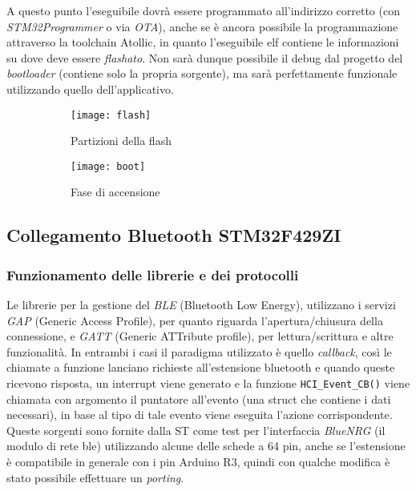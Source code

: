 A questo punto l'eseguibile dovr\`a essere programmato all'indirizzo corretto (con \textit{STM32Programmer} o via \textit{OTA}), anche se \`e ancora possibile la programmazione attraverso la toolchain Atollic, in quanto l'eseguibile elf contiene le informazioni su dove deve essere \textit{flashato}. Non sar\`a dunque possibile il debug dal progetto del \textit{bootloader} (contiene solo la propria sorgente), ma sar\`a perfettamente funzionale utilizzando quello dell'applicativo.

\begin{figure}[ht]
  \center
  \begin{subfigure}{.45\textwidth}
    \texttt{[image: flash]}
    \caption{Partizioni della flash}
  \end{subfigure}
  \hfill
  \begin{subfigure}{.45\textwidth}
    \texttt{[image: boot]}
    \caption{Fase di accensione}
  \end{subfigure}
  \caption{}
\end{figure}


\subsection{Collegamento Bluetooth STM32F429ZI}

\subsubsection{Funzionamento delle librerie e dei protocolli}

Le librerie per la gestione del \textit{BLE} (Bluetooth Low Energy), utilizzano i servizi \textit{GAP} (Generic Access Profile), per quanto riguarda l'apertura/chiusura della connessione, e \textit{GATT} (Generic ATTribute profile), per lettura/scrittura e altre funzionalit\`a. In entrambi i casi il paradigma utilizzato \`e quello \textit{callback}, cos\`i le chiamate a funzione lanciano richieste all'estensione bluetooth e quando queste ricevono risposta, un interrupt viene generato e la funzione \texttt{HCI\_Event\_CB()} viene chiamata con argomento il puntatore all'evento (una struct che contiene i dati necessari), in base al tipo di tale evento viene eseguita l'azione corrispondente.
Queste sorgenti sono fornite dalla ST come test per l'interfaccia \textit{BlueNRG} (il modulo di rete ble) utilizzando alcune delle schede a 64 pin, anche se l'estensione \`e compatibile in generale con i pin Arduino R3, quindi con qualche modifica \`e stato possibile effettuare un \textit{porting}.

